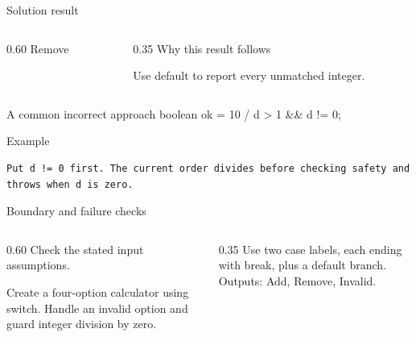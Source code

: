 \documentclass[10pt,aspectratio=169]{beamer}
\begin{document}
\begin{frame}[fragile,t]{Solution result}
\begin{columns}[T,onlytextwidth]\begin{column}{0.60\textwidth}
Remove
\end{column}\begin{column}{0.35\textwidth}\small
Why this result follows

Use default to report every unmatched integer.
\end{column}\end{columns}
\end{frame}

\begin{frame}[fragile,t]{A common incorrect approach}
boolean ok = 10 / d \textgreater{} 1 \&\& d != 0;
\vspace{1mm}\begin{block}{Example}
\begin{lstlisting}
Put d != 0 first. The current order divides before checking safety and throws when d is zero.
\end{lstlisting}
\end{block}
\end{frame}

\begin{frame}[fragile,t]{Boundary and failure checks}
\begin{columns}[T,onlytextwidth]\begin{column}{0.60\textwidth}
Check the stated input assumptions.

Create a four-option calculator using switch. Handle an invalid option and guard integer division by zero.
\end{column}\begin{column}{0.35\textwidth}\small
Use two case labels, each ending with break, plus a default branch. Outputs: Add, Remove, Invalid.
\end{column}\end{columns}
\end{frame}
\end{document}

